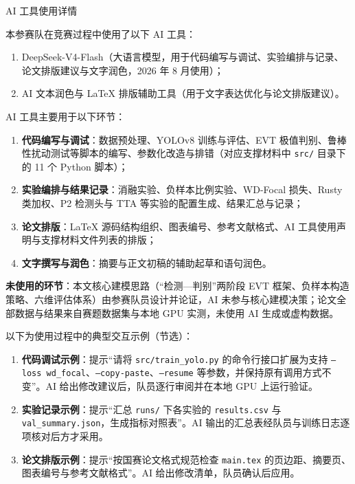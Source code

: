 \documentclass[12pt,a4paper]{ctexart}
\begin{document}
\begin{center}
  {\heiti AI 工具使用详情}
\end{center}

\vspace{1.2em}


本参赛队在竞赛过程中使用了以下 AI 工具：
\begin{enumerate}[leftmargin=2em,itemsep=2pt]
  \item DeepSeek-V4-Flash（大语言模型，用于代码编写与调试、实验编排与记录、论文排版建议与文字润色，2026 年 8 月使用）；
  \item AI 文本润色与 LaTeX 排版辅助工具（用于文字表达优化与论文排版建议）。
\end{enumerate}

\vspace{0.8em}

AI 工具主要用于以下环节：
\begin{enumerate}[leftmargin=2em,itemsep=2pt]
  \item \textbf{代码编写与调试}：数据预处理、YOLOv8 训练与评估、EVT 极值判别、鲁棒性扰动测试等脚本的编写、参数化改造与排错（对应支撑材料中 \texttt{src/} 目录下的 11 个 Python 脚本）；
  \item \textbf{实验编排与结果记录}：消融实验、负样本比例实验、WD-Focal 损失、Rusty 类加权、P2 检测头与 TTA 等实验的配置生成、结果汇总与记录；
  \item \textbf{论文排版}：LaTeX 源码结构组织、图表编号、参考文献格式、AI 工具使用声明与支撑材料文件列表的排版；
  \item \textbf{文字撰写与润色}：摘要与正文初稿的辅助起草和语句润色。
\end{enumerate}

\noindent\textbf{未使用的环节}：本文核心建模思路（“检测—判别”两阶段 EVT 框架、负样本构造策略、六维评估体系）由参赛队员设计并论证，AI 未参与核心建模决策；论文全部数据与结果来自赛题数据集与本地 GPU 实测，未使用 AI 生成或虚构数据。

\vspace{0.8em}

以下为使用过程中的典型交互示例（节选）：
\begin{enumerate}[leftmargin=2em,itemsep=4pt]
  \item \textbf{代码调试示例}：提示“请将 \texttt{src/train\_yolo.py} 的命令行接口扩展为支持 \texttt{--loss wd\_focal}、\texttt{--copy-paste}、\texttt{--resume} 等参数，并保持原有调用方式不变”。AI 给出修改建议后，队员逐行审阅并在本地 GPU 上运行验证。
  \item \textbf{实验记录示例}：提示“汇总 \texttt{runs/} 下各实验的 \texttt{results.csv} 与 \texttt{val\_summary.json}，生成指标对照表”。AI 输出的汇总表经队员与训练日志逐项核对后方才采用。
  \item \textbf{论文排版示例}：提示“按国赛论文格式规范检查 \texttt{main.tex} 的页边距、摘要页、图表编号与参考文献格式”。AI 给出修改清单，队员确认后应用。
\end{enumerate}
\end{document}
